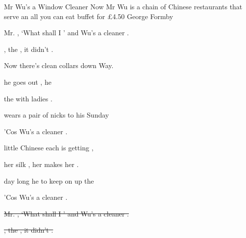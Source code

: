 \begin{SBSong}{Mr Wu's a Window Cleaner Now}
  {Mr Wu is a chain of Chinese restaurants that serve an all you can eat buffet for \pounds 4.50}
  {George Formby}
  \begin{SBChorus}
	 Mr. , `What shall I ' and  Wu's a  cleaner .
	
	, the , it didn't .
	
	Now there's  clean collars down  Way.
  \end{SBChorus}
  \begin{SBVerse}
	 he goes out ,  he 
	
	 the  with  ladies .
	
	 wears a pair of  nicks to  his Sunday 
	
	'Cos  Wu's a  cleaner .
  \end{SBVerse}
  \begin{SBVerse}
	 little Chinese  each  is getting ,
	
	 her silk , her  makes her .
	
	 day long he  to keep on  up the 
	
	'Cos  Wu's a  cleaner .
  \end{SBVerse}
  \begin{SBChorus}
	\sout{ Mr. , `What shall I ' and  Wu's a  cleaner .}
	
	\sout{, the , it didn't .}
	

\end{SBChorus}
\end{SBSong}
